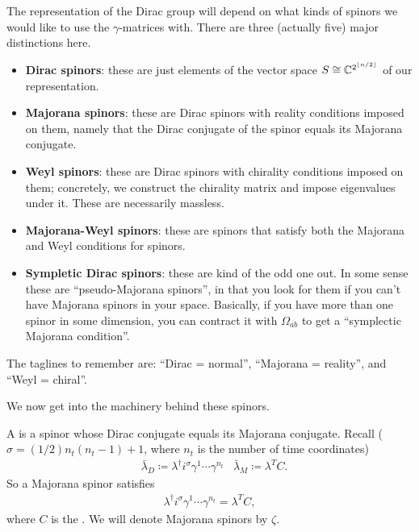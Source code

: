 \documentclass[11pt]{article}
\begin{document}
\begin{iidea}
    The representation of the Dirac group will depend on what kinds
    of spinors we would like to use the $\gamma$-matrices with.
    There are three (actually five) major distinctions here.
    \begin{itemize}
        \item \textbf{Dirac spinors}: these are just elements of
        the vector space $S \cong \mathbb{C}^{2^{\lfloor n/2 \rfloor}}$ of our
        representation.
        \item \textbf{Majorana spinors}: these are Dirac spinors with
        reality conditions imposed on them, namely that the Dirac conjugate
        of the spinor equals its Majorana conjugate.
        \item \textbf{Weyl spinors}: these are Dirac spinors with chirality
        conditions imposed on them; concretely, we construct the chirality
        matrix and impose eigenvalues under it. These are necessarily massless. 
        \item \textbf{Majorana-Weyl spinors}: these are spinors that satisfy
        both the Majorana and Weyl conditions for spinors.
        \item \textbf{Sympletic Dirac spinors}: these are kind of the odd one out.
        In some sense these are ``pseudo-Majorana spinors'', in that you look for them
        if you can't have Majorana spinors in your space. Basically, if you have more 
        than one spinor in some dimension, you can contract it with $\Omega_{ab}$ to get a
        ``symplectic Majorana condition''.
    \end{itemize}
    The taglines to remember are: ``Dirac = normal'', ``Majorana = reality'',
    and ``Weyl = chiral''.
\end{iidea}

\noin
We now get into the machinery behind these spinors.

\begin{definition}
    A  is a spinor whose Dirac conjugate equals its
    Majorana conjugate. Recall ($\sigma = (1/2)n_t (n_t - 1) + 1$, where $n_t$
    is the number of time coordinates)
    \begin{align*}
        & \bar{\lambda}_D \coloneqq \lambda^\dagger i^{\sigma} \gamma^1 \cdots \gamma^{n_t}
        & \bar{\lambda}_M \coloneqq \lambda^T C.
    \end{align*}
    So a Majorana spinor satisfies
    \begin{align*}
        \lambda^\dagger i^\sigma \gamma^1 \cdots \gamma^{n_t} = \lambda^T C,
    \end{align*}
    where $C$ is the . We will
    denote Majorana spinors by $\zeta$.
\end{definition}
\end{document}
